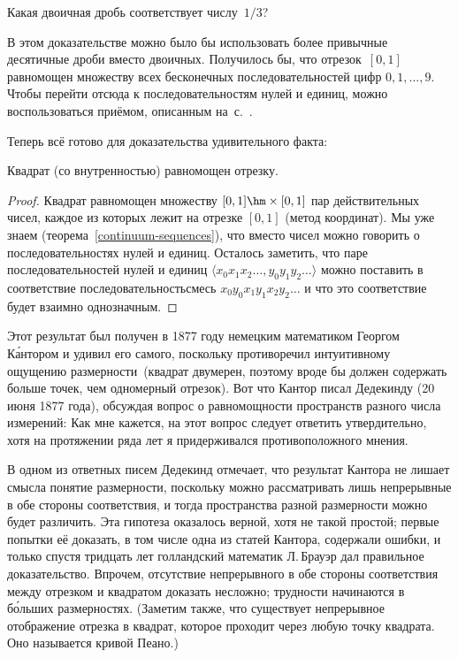 \begin{problem}
Какая двоичная дробь соответствует числу~$1/3$?
\end{problem}

В этом доказательстве можно было бы использовать более привычные
десятичные дроби вместо двоичных. Получилось бы, что отрезок~$[0,1]$
равномощен множеству всех бесконечных
последовательностей цифр $0,1,\dots,9$. Чтобы перейти отсюда к
последовательностям нулей и единиц, можно воспользоваться приёмом,
описанным на~с.~\pageref{01-012}.

Теперь всё готово для доказательства удивительного факта:

\begin{theorem}
        \label{square-and-segment}
    Квадрат (со внутренностью) равномощен отрезку.
\end{theorem}

\begin{proof}
Квадрат равномощен множеству $[0,1]\hm\times [0,1]$ пар
действительных чисел, каждое из которых лежит на отрезке $[0,1]$
(метод координат). Мы уже знаем (теорема~\ref{continuum-sequences}), что вместо чисел
можно говорить о последовательностях нулей и единиц. Осталось
заметить, что паре последовательностей нулей и единиц
$\langle x_0x_1x_2\ldots, y_0y_1y_2\ldots\rangle$
можно поставить в соответствие последовательность\д смесь
$x_0y_0x_1y_1x_2y_2\ldots$ и что это соответствие будет
взаимно однозначным.
\end{proof}

\begin{historyremark}
Этот результат был получен в 1877 году немецким математиком
Георгом К\'антором и удивил его самого, поскольку
противоречил интуитивному ощущению  размерности\ (квадрат
двумерен, поэтому вроде бы должен содержать больше точек, чем
одномерный отрезок). Вот что Кантор писал
Дедекинду (20 июня
1877 года), обсуждая вопрос о равномощности пространств разного
числа измерений:  Как мне кажется, на этот вопрос следует
ответить утвердительно, хотя на протяжении ряда лет я
придерживался противоположного мнения.

В одном из ответных писем Дедекинд отмечает, что результат
Кантора не лишает смысла понятие размерности, поскольку можно
рассматривать лишь непрерывные в обе стороны соответствия, и
тогда пространства разной размерности можно будет различить. Эта
гипотеза оказалось верной, хотя не такой простой; первые попытки
её доказать, в том числе одна из статей Кантора, содержали
ошибки, и только спустя тридцать лет голландский математик
Л.\,Брауэр дал правильное доказательство. Впрочем,
отсутствие непрерывного в обе стороны соответствия между
отрезком и квадратом доказать несложно; трудности начинаются в
б\'ольших размерностях. (Заметим также, что существует непрерывное
отображение отрезка в квадрат, которое проходит через любую
точку квадрата. Оно называется  кривой
Пеано.)
\end{historyremark}

